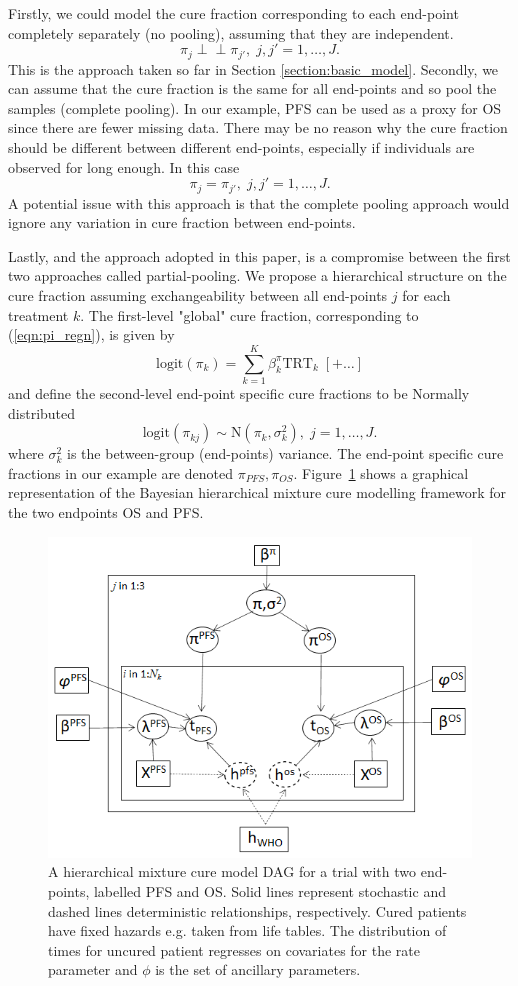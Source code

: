 \documentclass[AMA,STIX1COL]{WileyNJD-v2}
\begin{document}
Firstly, we could model the cure fraction corresponding to each end-point completely separately (no pooling), assuming that they are independent.
$$
\pi_j \perp\!\!\!\perp \pi_{j'}, \; j,j' = 1, \ldots, J.
$$
This is the approach taken so far in Section \ref{section:basic_model}.
Secondly, we can assume that the cure fraction is the same for all end-points and so pool the samples (complete pooling).
In our example, PFS can be used as a proxy for OS since there are fewer missing data.
There may be no reason why the cure fraction should be different between different end-points, especially if individuals are observed for long enough.
In this case
$$
\pi_j = \pi_{j'}, \; j,j' = 1, \ldots, J.
$$
A potential issue with this approach is that the complete pooling approach would ignore any variation in cure fraction between end-points.

Lastly, and the approach adopted in this paper, is a compromise between the first two approaches called partial-pooling.
We propose a hierarchical structure on the cure fraction assuming exchangeability between all end-points $j$ for each treatment $k$.
The first-level "global" cure fraction, corresponding to (\ref{eqn:pi_regn}), is given by
\begin{equation*}
\mbox{logit}(\pi_{k}) = \sum_{k=1}^K \beta^{\pi}_{k} \mbox{TRT}_k \;[+ \ldots]
\end{equation*}
and define the second-level end-point specific cure fractions to be Normally distributed 
$$
\text{logit}(\pi_{kj}) \sim \text{N}(\pi_k, \sigma_k^2), \; j = 1, \ldots, J.  
$$
where $\sigma_k^2$ is the between-group (end-points) variance.
The end-point specific cure fractions in our example are denoted $\pi_{PFS}, \pi_{OS}$.
Figure~\ref{fig:hier_dag} shows a graphical representation of the Bayesian hierarchical mixture cure modelling framework for the two endpoints OS and PFS.

\begin{figure}
\centering
\includegraphics[width=0.6\linewidth]{DAG_with_Tx.png}
\caption{\label{fig:hier_dag} A hierarchical mixture cure model DAG for a trial with two end-points, labelled PFS and OS.
Solid lines represent stochastic and dashed lines deterministic relationships, respectively.
Cured patients have fixed hazards e.g. taken from life tables.
The distribution of times for uncured patient regresses on covariates for the rate parameter and $\phi$ is the set of ancillary parameters.}
\end{figure}
\end{document}
